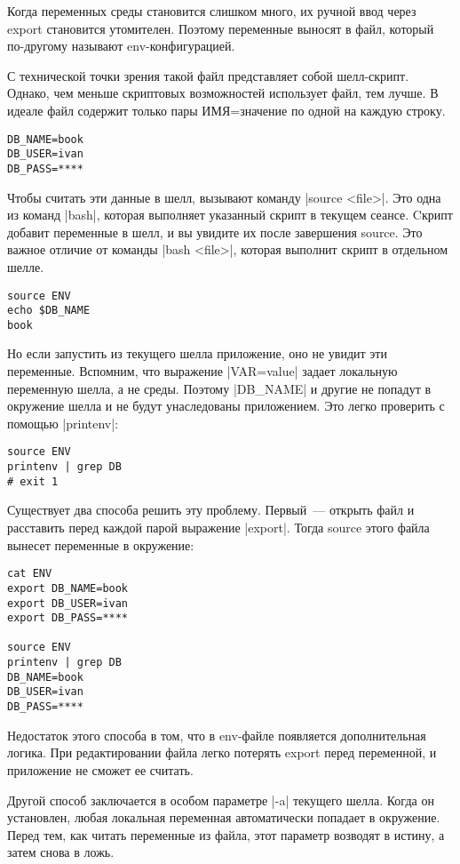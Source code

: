 Когда переменных среды становится слишком много, их ручной ввод через export
становится утомителен. Поэтому переменные выносят в файл, который по-другому
называют env-конфигурацией.

С технической точки зрения такой файл представляет собой шелл-скрипт. Однако,
чем меньше скриптовых возможностей использует файл, тем лучше. В идеале файл
содержит только пары ИМЯ=значение по одной на каждую строку.

\begin{verbatim}
DB_NAME=book
DB_USER=ivan
DB_PASS=****
\end{verbatim}

Чтобы считать эти данные в шелл, вызывают команду \spverb|source <file>|. Это одна из
команд \spverb|bash|, которая выполняет указанный скрипт в текущем сеансе. Cкрипт
добавит переменные в шелл, и вы увидите их после завершения source. Это важное
отличие от команды \spverb|bash <file>|, которая выполнит скрипт в отдельном шелле.

\begin{verbatim}
source ENV
echo $DB_NAME
book
\end{verbatim}

Но если запустить из текущего шелла приложение, оно не увидит эти
переменные. Вспомним, что выражение \spverb|VAR=value| задает локальную переменную
шелла, а не среды. Поэтому \spverb|DB_NAME| и другие не попадут в окружение шелла и не
будут унаследованы приложением. Это легко проверить с помощью \spverb|printenv|:

\begin{verbatim}
source ENV
printenv | grep DB
# exit 1
\end{verbatim}

Существует два способа решить эту проблему. Первый~--- открыть файл и расставить
перед каждой парой выражение \spverb|export|. Тогда source этого файла вынесет
переменные в окружение:

\begin{verbatim}
cat ENV
export DB_NAME=book
export DB_USER=ivan
export DB_PASS=****

source ENV
printenv | grep DB
DB_NAME=book
DB_USER=ivan
DB_PASS=****
\end{verbatim}

Недостаток этого способа в том, что в env-файле появляется дополнительная
логика. При редактировании файла легко потерять export перед переменной, и
приложение не сможет ее считать.

Другой способ заключается в особом параметре \spverb|-a| текущего шелла. Когда он
установлен, любая локальная переменная автоматически попадает в окружение. Перед
тем, как читать переменные из файла, этот параметр возводят в истину, а затем
снова в ложь.

